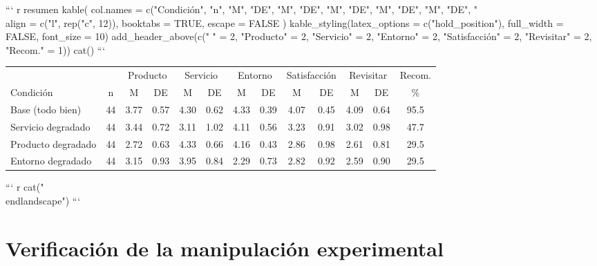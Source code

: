 \documentclass[
  spanish,
]{article}
\begin{document}
\begin{landscape}

``` r
resumen %
  kable(
    col.names = c("Condición", "n",
                   "M", "DE", "M", "DE", "M", "DE",
                   "M", "DE", "M", "DE", "\\%
    align    = c("l", rep("c", 12)),
    booktabs = TRUE,
    escape   = FALSE
  ) %
  kable_styling(latex_options = c("hold_position"),
                full_width = FALSE,
                font_size = 10) %
  add_header_above(c(" " = 2,
                     "Producto" = 2, "Servicio" = 2, "Entorno" = 2,
                     "Satisfacción" = 2, "Revisitar" = 2,
                     "Recom." = 1)) %
  cat()
```

\begin{table}[!h]
\centering\begingroup\fontsize{10}{12}\selectfont

\begin{tabular}{lcccccccccccc}
\toprule
\multicolumn{2}{c}{ } & \multicolumn{2}{c}{Producto} & \multicolumn{2}{c}{Servicio} & \multicolumn{2}{c}{Entorno} & \multicolumn{2}{c}{Satisfacción} & \multicolumn{2}{c}{Revisitar} & \multicolumn{1}{c}{Recom.} \\
\cmidrule(l{3pt}r{3pt}){3-4} \cmidrule(l{3pt}r{3pt}){5-6} \cmidrule(l{3pt}r{3pt}){7-8} \cmidrule(l{3pt}r{3pt}){9-10} \cmidrule(l{3pt}r{3pt}){11-12} \cmidrule(l{3pt}r{3pt}){13-13}
Condición & n & M & DE & M & DE & M & DE & M & DE & M & DE & \%\\
\midrule
Base (todo bien) & 44 & 3.77 & 0.57 & 4.30 & 0.62 & 4.33 & 0.39 & 4.07 & 0.45 & 4.09 & 0.64 & 95.5\\
Servicio degradado & 44 & 3.44 & 0.72 & 3.11 & 1.02 & 4.11 & 0.56 & 3.23 & 0.91 & 3.02 & 0.98 & 47.7\\
Producto degradado & 44 & 2.72 & 0.63 & 4.33 & 0.66 & 4.16 & 0.43 & 2.86 & 0.98 & 2.61 & 0.81 & 29.5\\
Entorno degradado & 44 & 3.15 & 0.93 & 3.95 & 0.84 & 2.29 & 0.73 & 2.82 & 0.92 & 2.59 & 0.90 & 29.5\\
\bottomrule
\end{tabular}
\endgroup{}
\end{table}

``` r
cat("\n\\end{landscape}\n")
```


\end{landscape}

\section{Verificación de la manipulación
experimental}\label{verificaciuxf3n-de-la-manipulaciuxf3n-experimental}
\end{document}
